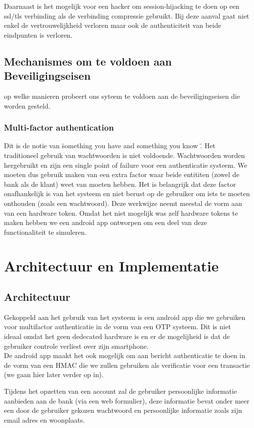 \documentclass[11pt]{article}
\begin{document}
Daarnaast is het mogelijk voor een hacker om session-hijacking te doen op een ssl/tls verbinding als de verbinding compressie gebruikt. Bij deze aanval gaat niet enkel de vertrouwelijkheid verloren maar ook de authenticiteit van beide eindpunten is verloren.

\subsection{Mechanismes om te voldoen aan Beveiligingseisen}
op welke manieren probeert ons syteem te voldoen aan de beveiligingseisen die worden gesteld.

\subsubsection{Multi-factor authentication}
Dit is de notie van \"something you have and something you know \". 
Het traditioneel gebruik van wachtwoorden is niet voldoende. Wachtwoorden worden hergebruikt en zijn een single point of failure voor een authenticatie systeem. We moeten dus gebruik maken van een extra factor waar beide entititen (zowel de bank als de klant) weet van moeten hebben. Het is belangrijk dat deze factor onafhankelijk is van het systeem en niet berust op de gebruiker om iets te moeten onthouden (zoals een wachtwoord). Deze werkwijze neemt meestal de vorm aan van een hardware token. Omdat het niet mogelijk was zelf hardware tokens te maken hebben we een android app ontworpen om een deel van deze functionaliteit te simuleren.
\section{Architectuur en Implementatie}
\subsection{Architectuur}
Gekoppeld aan het gebruik van het systeem is een android app die we gebruiken voor multifactor authenticatie in de vorm van een OTP systeem. Dit is niet ideaal omdat het geen dedecated hardware is en er de mogelijheid is dat de gebruiker controle verliest over zijn smartphone.\\

De android app maakt het ook mogelijk om aan bericht authenticatie te doen in de vorm van een HMAC die we zullen gebruiken als verificatie voor een transactie (we gaan hier later verder op in).

Tijdens het opzetten van een account zal de gebruiker persoonlijke informatie aanbieden aan de bank (via een web formulier), deze informatie bevat onder meer een door de gebruiker gekozen wachtwoord en persoonlijke informatie zoals zijn email adres en woonplaats.\\
\end{document}
